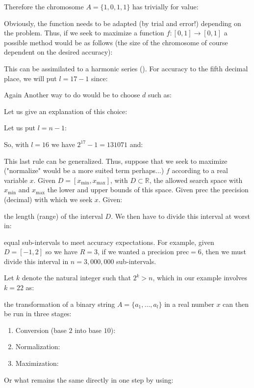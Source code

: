 	Therefore the chromosome $A=\{1,0,1,1\}$ has trivially for value:
	
	Obviously, the function needs to be adapted (by trial and error!) depending on the problem. Thus, if we seek to maximize a function $f:[0,1]\rightarrow [0,1]$ a possible method would be as follows (the size of the chromosome of course dependent on the desired accuracy):
	
	
	This can be assimilated to a harmonic series (). For accuracy to the fifth decimal place, we will put $l=17-1$ since:
	
	Again Another way to do would be to choose $d$ such as:
	
	Let us give an explanation of this choice:
	
	Let us put $l=n-1$:
	
	So, with $l=16$ we have $2^{17}-1=131071$ and:
	
	This last rule can be generalized. Thus, suppose that we seek to maximize ("normalize" would be a more suited term perhaps...) $f$ according to a real variable $x$. Given $D=[x_{\min},x_{\max}]$, with $D\subset \mathbb{R}$, the allowed  search space with $x_{\min}$ and $x_{\max}$ the lower and upper bounds of this space. Given $\mathrm{prec}$ the precision (decimal) with which we seek $x$. Given:
	
	the length (range) of the interval $D$. We then have to divide this interval at worst in:
	
	equal sub-intervals to meet accuracy expectations. For example, given $D=[-1,2]$ so we have $R=3$, if we wanted a precision $\mathrm{prec}=6$, then we must divide this interval in $n=3,000,000$ sub-intervals.
	
	Let $k$ denote the natural integer such that $2^k>n$, which in our example involves $k=22$ as:
	
	the transformation of a binary string $A=\{a_1,\ldots,a_l\}$ in a real number $x$ can then be run in three stages:
	\begin{enumerate}
		\item Conversion (base $2$ into base $10$):
		

		\item Normalization:
		

		\item Maximization:
		
	\end{enumerate}
	Or what remains the same directly in one step by using:
	
